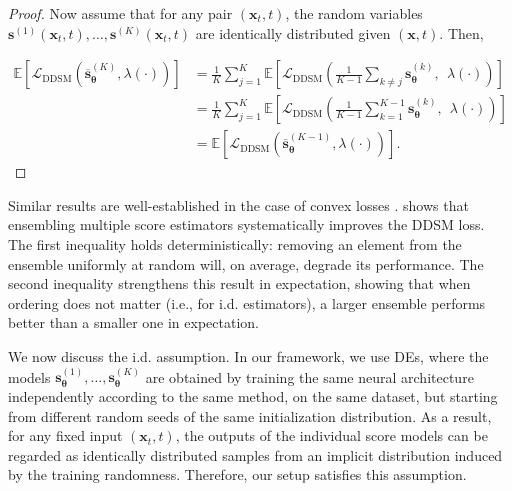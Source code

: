 \documentclass[10pt]{article} %
\newcommand{\DDSM}{\text{DDSM}}
\def\rvx{{\mathbf{x}}}
\def\vtheta{{\bm{\theta}}}
\def\vs{{\bm{s}}}
\begin{document}
\begin{proof}
Now assume that for any pair $(\rvx_t,t)$, the random variables $\vs^{(1)}(\rvx_t,t),\dots,\vs^{(K)}(\rvx_t,t)$ are identically distributed given $(\rvx,t)$. Then,

\begin{align}
\mathbb{E}[\mathcal{L}_\DDSM(\overline{\vs}_\vtheta^{(K)},\lambda(\cdot))] & = \frac{1}{K} \sum_{j=1}^K \mathbb{E}  \left[ \mathcal{L}_\DDSM\left(\frac{1}{K-1} \sum_{k \neq j} \vs_\vtheta^{(k)},\:\:\lambda(\cdot)\right) \right] \\
& = \frac{1}{K} \sum_{j=1}^K \mathbb{E}  \left[ \mathcal{L}_\DDSM\left(\frac{1}{K-1} \sum_{k = 1}^{K-1} \vs_\vtheta^{(k)},\:\:\lambda(\cdot)\right) \right] \\
& = \mathbb{E}  \left[ \mathcal{L}_\DDSM\left(\overline{\vs}_\vtheta^{(K-1)},\lambda(\cdot)\right) \right].
\end{align}

\end{proof}
Similar results are well-established in the case of convex losses \citep{ mattei2024ensemblesgettingbettertime}.  shows that ensembling multiple score estimators systematically improves the DDSM loss. The first inequality holds deterministically: removing an element from the ensemble uniformly at random will, on average, degrade its performance. The second inequality strengthens this result in expectation, showing that when ordering does not matter (i.e., for i.d. estimators), a larger ensemble performs better than a smaller one in expectation. 

We now discuss the i.d. assumption. In our framework, we use DEs, where the models $\vs_\vtheta^{(1)}, \dots, \vs_\vtheta^{(K)}$ are obtained by training the same neural architecture independently according to the same method, on the same dataset, but starting from different random seeds of the same initialization distribution. As a result, for any fixed input $(\rvx_t, t)$, the outputs of the individual score models can be regarded as identically distributed samples from an implicit distribution induced by the training randomness. Therefore, our setup satisfies this assumption. 
\end{document}

